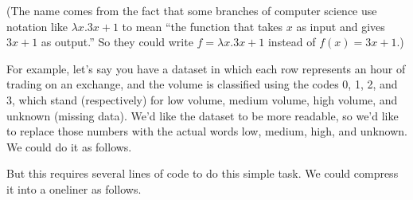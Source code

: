 \documentclass[letterpaper,10pt,english]{jupyterBook}
\begin{document}
\sphinxAtStartPar
(The name comes from the fact that some branches of computer science use notation like \(\lambda x.3x+1\) to mean “the function that takes \(x\) as input and gives \(3x+1\) as output.”  So they could write \(f=\lambda x.3x+1\) instead of \(f(x)=3x+1\).)

\sphinxAtStartPar
For example, let’s say you have a dataset in which each row represents an hour of trading on an exchange, and the volume is classified using the codes 0, 1, 2, and 3, which stand (respectively) for low volume, medium volume, high volume, and unknown (missing data).  We’d like the dataset to be more readable, so we’d like to replace those numbers with the actual words low, medium, high, and unknown.  We could do it as follows.

\begin{sphinxVerbatim}[commandchars=\\\{\}]
    
      \PYG{p}{[}     \PYG{p}{]}
     \PYG{p}{[}\PYG{p}{]}

\PYG{p}{[}\PYG{p}{]}  \PYG{p}{[}\PYG{p}{]}  
\end{sphinxVerbatim}

\sphinxAtStartPar
But this requires several lines of code to do this simple task.  We could compress it into a one\sphinxhyphen{}liner as follows.

\begin{sphinxVerbatim}[commandchars=\\\{\}]
\PYG{p}{[}\PYG{p}{]}  \PYG{p}{[}\PYG{p}{]}   \PYG{p}{[}\PYG{p}{]}\PYG{p}{[}\PYG{p}{]} 
\end{sphinxVerbatim}
\end{document}
